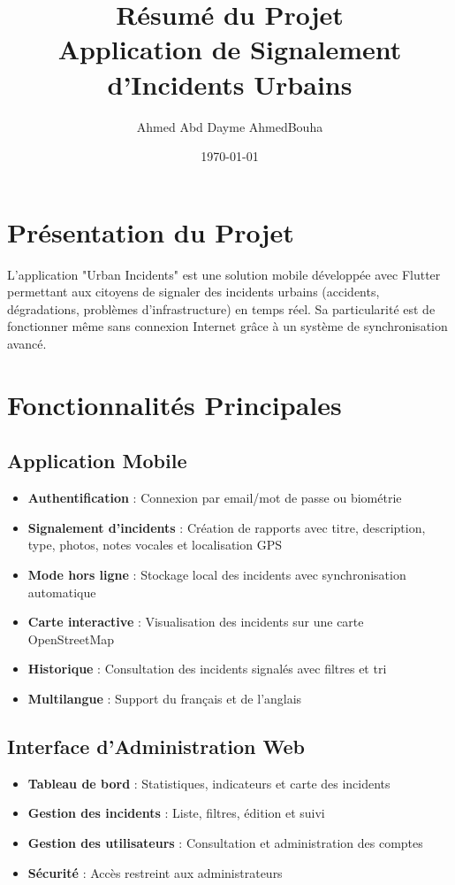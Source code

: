 \documentclass[12pt,a4paper]{article}
\title{\LARGE\textbf{Résumé du Projet\\Application de Signalement d'Incidents Urbains}}
\author{\Large Ahmed Abd Dayme AhmedBouha\\}
\date{\today}
\begin{document}
\maketitle

\section*{Présentation du Projet}

L'application "Urban Incidents" est une solution mobile développée avec Flutter permettant aux citoyens de signaler des incidents urbains (accidents, dégradations, problèmes d'infrastructure) en temps réel. Sa particularité est de fonctionner même sans connexion Internet grâce à un système de synchronisation avancé.

\section*{Fonctionnalités Principales}

\subsection*{Application Mobile}

\begin{itemize}
    \item \textbf{Authentification} : Connexion par email/mot de passe ou biométrie
    \item \textbf{Signalement d'incidents} : Création de rapports avec titre, description, type, photos, notes vocales et localisation GPS
    \item \textbf{Mode hors ligne} : Stockage local des incidents avec synchronisation automatique
    \item \textbf{Carte interactive} : Visualisation des incidents sur une carte OpenStreetMap
    \item \textbf{Historique} : Consultation des incidents signalés avec filtres et tri
    \item \textbf{Multilangue} : Support du français et de l'anglais
\end{itemize}

\subsection*{Interface d'Administration Web}

\begin{itemize}
    \item \textbf{Tableau de bord} : Statistiques, indicateurs et carte des incidents
    \item \textbf{Gestion des incidents} : Liste, filtres, édition et suivi
    \item \textbf{Gestion des utilisateurs} : Consultation et administration des comptes
    \item \textbf{Sécurité} : Accès restreint aux administrateurs
\end{itemize}
\end{document}
